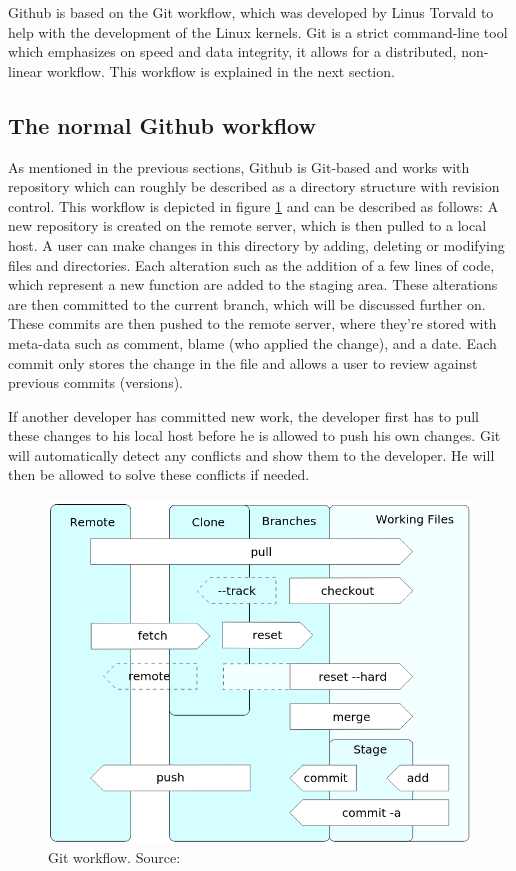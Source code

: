 \documentclass[fleqn,10pt]{SelfArx} %
\begin{document}
Github is based on the Git workflow, which was developed by Linus Torvald to help with the development of the Linux kernels. Git is a strict command-line tool which emphasizes on speed and data integrity, it allows for a distributed, non-linear workflow. This workflow is explained in the next section.

\subsection{The normal Github workflow}\label{sec:nomal github workflow}
As mentioned in the previous sections, Github is Git-based and works with repository which can roughly be described as a directory structure with revision control. This workflow is depicted in figure \ref{fig:gitworkflow} and can be described as follows: A new repository is created on the remote server, which is then pulled to a local host. A user can make changes in this directory by adding, deleting or modifying files and directories. Each alteration such as the addition of a few lines of code, which represent a new function are added to the staging area. These alterations are then committed to the current branch, which will be discussed further on. These commits are then pushed to the remote server, where they're stored with meta-data such as comment, blame (who applied the change), and a date. Each commit only stores the change in the file and allows a user to review against previous commits (versions). 

If another developer has committed new work, the developer first has to pull these changes to his local host before he is allowed to push his own changes. Git will automatically detect any conflicts and show them to the developer. He will then be allowed to solve these conflicts if needed.

\begin{figure}[t]
	\includegraphics[width=\textwidth/2]{../images/githubworkflow1.png}
	\caption{Git workflow. Source: \citeauthor{_git_2015} \cite{_git_2015}}\label{fig:gitworkflow}
\end{figure}
\end{document}
